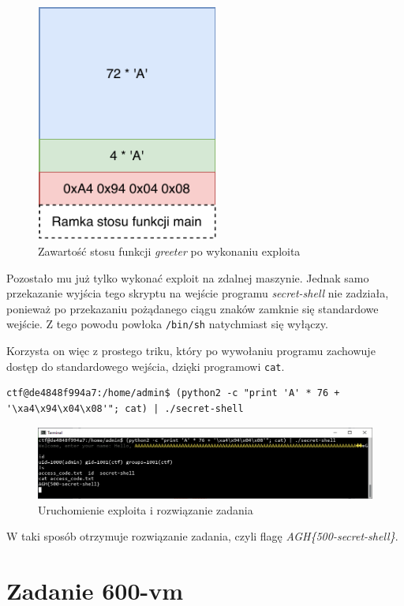 \documentclass[language=polish,type=eng]{aghmodern}
\begin{document}
\begin{figure}[H]
\centering
\includegraphics[width=6cm]{500_overflow}
\caption{Zawartość stosu funkcji \emph{greeter} po wykonaniu exploita}
\end{figure}

Pozostało mu już tylko wykonać exploit na zdalnej maszynie. Jednak samo przekazanie
wyjścia tego skryptu na wejście programu \emph{secret-shell} nie zadziała, ponieważ
po przekazaniu pożądanego ciągu znaków zamknie się standardowe wejście.
Z tego powodu powłoka \texttt{/bin/sh} natychmiast się wyłączy.

Korzysta on więc z prostego triku, który po wywołaniu programu zachowuje dostęp
do standardowego wejścia, dzięki programowi \texttt{cat}.

\begin{verbatim}
ctf@de4848f994a7:/home/admin$ (python2 -c "print 'A' * 76 + '\xa4\x94\x04\x08'"; cat) | ./secret-shell
\end{verbatim}

\begin{figure}[H]
\centering
\includegraphics[width=\textwidth]{500_solution}
\caption{Uruchomienie exploita i rozwiązanie zadania}
\end{figure}

W taki sposób otrzymuje rozwiązanie zadania, czyli flagę \emph{AGH\{500-secret-shell\}}.

\section{Zadanie 600-vm}
\end{document}

